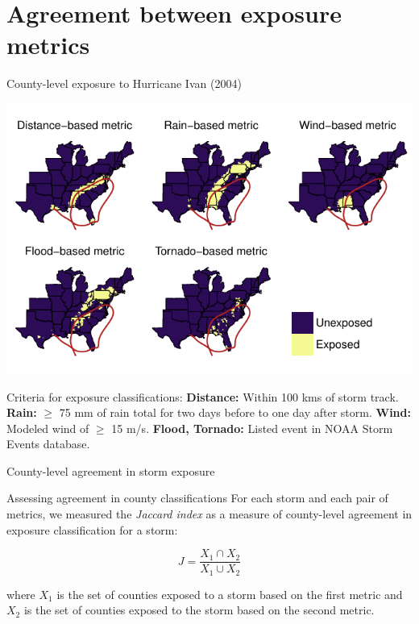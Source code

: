\documentclass[ignorenonframetext,]{beamer}
\begin{document}
\section{Agreement between exposure
metrics}\label{agreement-between-exposure-metrics}

\begin{frame}{County-level exposure to Hurricane Ivan (2004)}

\vspace{-0.6cm}

\begin{center}\includegraphics[height=0.75\textheight]{ivanexposurepresentation} \end{center}

\vspace{-0.5cm} \scriptsize Criteria for exposure classifications:
\textbf{Distance:} Within 100 kms of storm track. \textbf{Rain:} \(\ge\)
75 mm of rain total for two days before to one day after storm.
\textbf{Wind:} Modeled wind of \(\ge\) 15 m/s. \textbf{Flood, Tornado:}
Listed event in NOAA Storm Events database.

\end{frame}

\begin{frame}{County-level agreement in storm exposure}

\begin{block}{Assessing agreement in county classifications}
For each storm and each pair of metrics, we measured the \textit{Jaccard index} as a measure of county-level agreement in exposure classification for a storm:

\begin{equation*}
J = \frac{X_1 \cap X_2}{X_1 \cup X_2}
\end{equation*}

where $X_1$ is the set of counties exposed to a storm based on the first metric and $X_2$ is the set of counties exposed to the storm based on the second metric. 

\end{block}

\end{frame}
\end{document}
